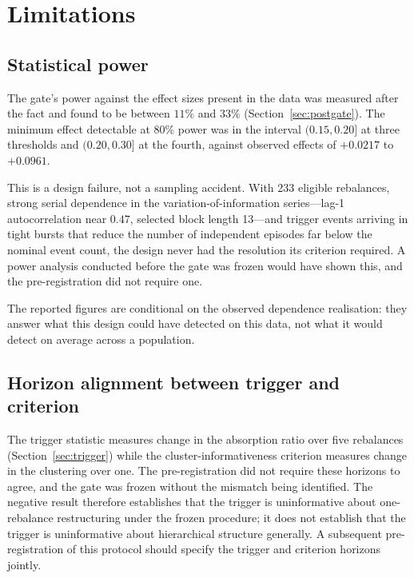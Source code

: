\documentclass[12pt,letterpaper]{article}
\begin{document}
\section{Limitations}

\subsection{Statistical power}

The gate's power against the effect sizes present in the data was measured after the
fact and found to be between $11\%$ and $33\%$ (Section~\ref{sec:postgate}). The minimum
effect detectable at $80\%$ power was in the interval $(0.15, 0.20]$ at three thresholds
and $(0.20, 0.30]$ at the fourth, against observed effects of $+0.0217$ to $+0.0961$.

This is a design failure, not a sampling accident. With 233 eligible rebalances, strong
serial dependence in the variation-of-information series---lag-1 autocorrelation near
$0.47$, selected block length 13---and trigger events arriving in tight bursts that
reduce the number of independent episodes far below the nominal event count, the design
never had the resolution its criterion required. A power analysis conducted before the
gate was frozen would have shown this, and the pre-registration did not require one.

The reported figures are conditional on the observed dependence realisation: they answer
what this design could have detected on this data, not what it would detect on average
across a population.

\subsection{Horizon alignment between trigger and criterion}
\label{sec:horizon}

The trigger statistic measures change in the absorption ratio over five rebalances
(Section~\ref{sec:trigger}) while the cluster-informativeness criterion measures change in the
clustering over one. The pre-registration did not require these horizons to agree, and
the gate was frozen without the mismatch being identified. The negative result
therefore establishes that the trigger is uninformative about one-rebalance
restructuring under the frozen procedure; it does not establish that the trigger is
uninformative about hierarchical structure generally. A subsequent pre-registration of
this protocol should specify the trigger and criterion horizons jointly.
\end{document}
